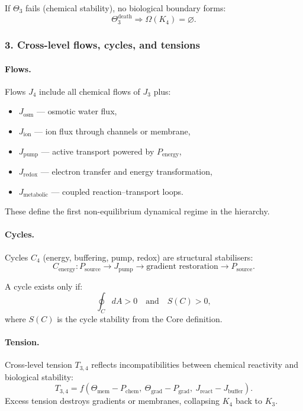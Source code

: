 If $\Theta_3$ fails (chemical stability), no biological boundary forms:
\[
\Theta_3^{\mathrm{death}} \Rightarrow \Omega(K_4)=\varnothing.
\]

\subsubsection{3. Cross-level flows, cycles, and tensions}

\paragraph{Flows.}
Flows $J_4$ include all chemical flows of $J_3$ plus:
\begin{itemize}
  \item $J_{\mathrm{osm}}$ — osmotic water flux,
  \item $J_{\mathrm{ion}}$ — ion flux through channels or membrane,
  \item $J_{\mathrm{pump}}$ — active transport powered by $P_{\mathrm{energy}}$,
  \item $J_{\mathrm{redox}}$ — electron transfer and energy transformation,
  \item $J_{\mathrm{metabolic}}$ — coupled reaction–transport loops.
\end{itemize}

These define the first non-equilibrium dynamical regime in the hierarchy.

\paragraph{Cycles.}
Cycles $C_4$ (energy, buffering, pump, redox) are structural stabilisers:
\[
C_{\mathrm{energy}} : P_{\mathrm{source}} \rightarrow J_{\mathrm{pump}}
\rightarrow \text{gradient restoration} \rightarrow P_{\mathrm{source}}.
\]

A cycle exists only if:
\[
\oint_C dA > 0 \quad\text{and}\quad S(C) > 0,
\]
where $S(C)$ is the cycle stability from the Core definition.

\paragraph{Tension.}
Cross-level tension $T_{3,4}$ reflects incompatibilities between chemical
reactivity and biological stability:
\[
T_{3,4} = f(\Theta_{\mathrm{mem}} - P_{\mathrm{chem}},\
           \Theta_{\mathrm{grad}} - P_{\mathrm{grad}},\
           J_{\mathrm{react}} - J_{\mathrm{buffer}}).
\]
Excess tension destroys gradients or membranes,
collapsing $K_4$ back to $K_3$.

